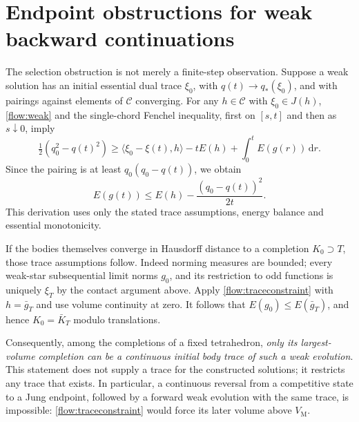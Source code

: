 \documentclass[11pt]{article}
\theoremstyle{remark}\newtheorem{remark}[theorem]{Remark}
\newcommand{\VM}{V_{\mathrm M}}
\newcommand{\dd}{\,\mathrm d}
\newcommand{\C}{\mathcal C}
\begin{document}
\section{Endpoint obstructions for weak backward continuations}
The selection obstruction is not merely a finite-step observation. Suppose a weak solution has an initial essential dual trace $\xi_0$, with $q(t)\to q_*(\xi_0)$, and with pairings against elements of $\C$ converging. For any $h\in\C$ with $\xi_0\in J(h)$, \eqref{flow:weak} and the single-chord Fenchel inequality, first on $[s,t]$ and then as $s\downarrow0$, imply
\[
 \tfrac12(q_0^2-q(t)^2)
 \geq\langle\xi_0-\xi(t),h\rangle-tE(h)+\int_0^t E(g(r))\dd r.
\]
Since the pairing is at least $q_0(q_0-q(t))$, we obtain
\begin{equation}\label{flow:traceconstraint}
 E(g(t))\leq E(h)-\frac{(q_0-q(t))^2}{2t}.
\end{equation}
This derivation uses only the stated trace assumptions, energy balance and essential monotonicity.

If the bodies themselves converge in Hausdorff distance to a completion $K_0\supset T$, those trace assumptions follow. Indeed norming measures are bounded; every weak-star subsequential limit norms $g_0$, and its restriction to odd functions is uniquely $\xi_T$ by the contact argument above. Apply \eqref{flow:traceconstraint} with $h=\bar g_T$ and use volume continuity at zero. It follows that $E(g_0)\leq E(\bar g_T)$, and hence $K_0=\bar K_T$ modulo translations.

Consequently, among the completions of a fixed tetrahedron, \emph{only its largest-volume completion can be a continuous initial body trace of such a weak evolution}. This statement does not supply a trace for the constructed solutions; it restricts any trace that exists. In particular, a continuous reversal from a competitive state to a Jung endpoint, followed by a forward weak evolution with the same trace, is impossible: \eqref{flow:traceconstraint} would force its later volume above $\VM$.
\end{document}
